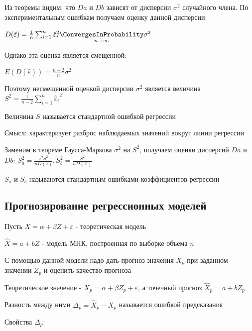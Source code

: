 Из теоремы видим, что $Da$ и $Db$ зависят от дисперсии $\sigma^2$ случайного члена. 
По экспериментальным ошибкам получаем оценку данной дисперсии:

$D(\hat \varepsilon) = \frac{1}{n} \sum_{i = 1}^n {\hat \varepsilon_i}^2 \underset{n \to \infty}{\ConvergesInProbability} \sigma^2$

Однако эта оценка является смещенной:

$E(D(\hat \varepsilon)) = \frac{n - 2}{n} \sigma^2$

Поэтому несмещенной оценкой дисперсии $\sigma^2$ является величина $S^2 = \frac{1}{n - 2} \sum_{i = 1}^n {\hat \varepsilon_i}^2$

\Def Величина $S$ называется стандартной ошибкой регрессии

Смысл: характеризует разброс наблюдаемых значений вокруг линии регрессии

\Nota Заменим в теореме Гаусса-Маркова $\sigma^2$ на $S^2$, получаем оценки дисперсий $Da$ и $Db$: $S_a^2 = \frac{\overline{z^2} S^2}{n D(z)}, S^2_b = \frac{S^2}{n D(Z)}$

\Def $S_a$ и $S_b$ называются стандартным ошибками коэффициентов регрессии

\subsection{Прогнозирование регрессионных моделей}

Пусть $X = \alpha + \beta Z + \varepsilon$ - теоретическая модель

$\hat X = a + b Z$ - модель МНК, построенная по выборке объема $n$

С помощью данной модели надо дать прогноз значения $X_p$ при заданном значении $Z_p$ и оценить качество прогноза 

Теоретическое значение - $X_p = \alpha + \beta Z_p + \varepsilon$, а точечный прогноз $\hat X_p = a + b Z_p$

Разность между ними $\Delta_p = \hat X_p - X_p$ называется ошибкой предсказания

Свойства $\Delta_p$:

